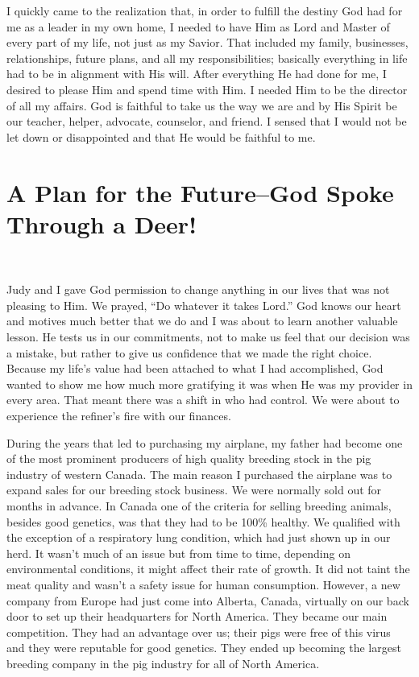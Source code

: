 \documentclass[oneside]{book}
\begin{document}
I quickly came to the realization that, in order to fulfill the destiny God had for me as a leader in my own home, I needed to have Him as Lord and Master of every part of my life, not just as my Savior. That included my family, businesses, relationships, future plans, and all my responsibilities; basically everything in life had to be in alignment with His will. After everything He had done for me, I desired to please Him and spend time with Him. I needed Him to be the director of all my affairs. God is faithful to take us the way we are and by His Spirit be our teacher, helper, advocate, counselor, and friend. I sensed that I would not be let down or disappointed and that He would be faithful to me.


\chapter{A Plan for the Future--God Spoke Through a Deer!}
\

Judy and I gave God permission to change anything in our lives that was not pleasing to Him. We prayed, “Do whatever it takes Lord.” God knows our heart and motives much better that we do and I was about to learn another valuable lesson. He tests us in our commitments, not to make us feel that our decision was a mistake, but rather to give us confidence that we made the right choice. Because my life’s value had been attached to what I had accomplished, God wanted to show me how much more gratifying it was when He was my provider in every area. That meant there was a shift in who had control. We were about to experience the refiner's fire with our finances.

During the years that led to purchasing my airplane, my father had become one of the most prominent producers of high quality breeding stock in the pig industry of western Canada. The main reason I purchased the airplane was to expand sales for our breeding stock business. We were normally sold out for months in advance. In Canada one of the criteria for selling breeding animals, besides good genetics, was that they had to be 100\% healthy. We qualified with the exception of a respiratory lung condition, which had just shown up in our herd. It wasn't much of an issue but from time to time, depending on environmental conditions, it might affect their rate of growth. It did not taint the meat quality and wasn't a safety issue for human consumption. However, a new company from Europe had just come into Alberta, Canada, virtually on our back door to set up their headquarters for North America. They became our main competition. They had an advantage over us; their pigs were free of this virus and they were reputable for good genetics. They ended up becoming the largest breeding company in the pig industry for all of North America. 
\end{document}

